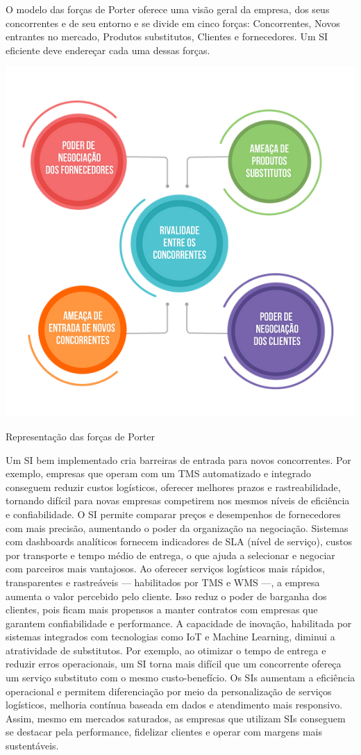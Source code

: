 \documentclass[conference]{IEEEtran}
\begin{document}
O modelo das forças de Porter oferece uma visão geral da empresa, dos seus concorrentes e de seu entorno e se divide em cinco forças: Concorrentes, Novos entrantes no mercado, Produtos substitutos, Clientes e fornecedores. Um SI eficiente deve endereçar cada uma dessas forças.\cite{sebraePorter2025} 
\begin{center}
    \includegraphics[width=0.8\linewidth]{7c8300_9e949360c69240ed92aab96ce376d792~mv2.png}
    \caption{Representação das forças de Porter\cite{imgporter}}
    \label{fig:forças-porter}
\end{center}


Um SI bem implementado cria barreiras de entrada para novos concorrentes. Por exemplo, empresas que operam com um TMS automatizado e integrado conseguem reduzir custos logísticos, oferecer melhores prazos e rastreabilidade, tornando difícil para novas empresas competirem nos mesmos níveis de eficiência e confiabilidade. O SI permite comparar preços e desempenhos de fornecedores com mais precisão, aumentando o poder da organização na negociação. Sistemas com dashboards analíticos fornecem indicadores de SLA (nível de serviço), custos por transporte e tempo médio de entrega, o que ajuda a selecionar e negociar com parceiros mais vantajosos. Ao oferecer serviços logísticos mais rápidos, transparentes e rastreáveis — habilitados por TMS e WMS —, a empresa aumenta o valor percebido pelo cliente. Isso reduz o poder de barganha dos clientes, pois ficam mais propensos a manter contratos com empresas que garantem confiabilidade e performance. A capacidade de inovação, habilitada por sistemas integrados com tecnologias como IoT e Machine Learning, diminui a atratividade de substitutos. Por exemplo, ao otimizar o tempo de entrega e reduzir erros operacionais, um SI torna mais difícil que um concorrente ofereça um serviço substituto com o mesmo custo-benefício. Os SIs aumentam a eficiência operacional e permitem diferenciação por meio da personalização de serviços logísticos, melhoria contínua baseada em dados e atendimento mais responsivo. Assim, mesmo em mercados saturados, as empresas que utilizam SIs conseguem se destacar pela performance, fidelizar clientes e operar com margens mais sustentáveis.
\end{document}
